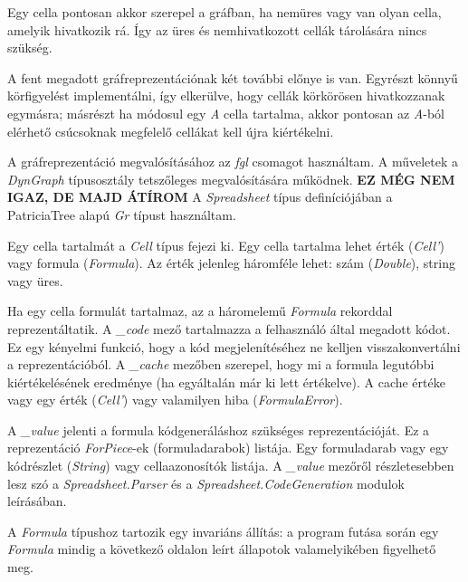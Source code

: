 Egy cella pontosan akkor szerepel a gráfban, ha nemüres vagy van olyan cella, amelyik hivatkozik rá. Így az üres és nemhivatkozott cellák tárolására nincs szükség.

A fent megadott gráfreprezentációnak két további előnye is van. Egyrészt könnyű körfigyelést implementálni, így elkerülve, hogy cellák körkörösen hivatkozzanak egymásra; másrészt ha módosul egy \textit{A} cella tartalma, akkor pontosan az \textit{A}-ból elérhető csúcsoknak megfelelő cellákat kell újra kiértékelni.

A gráfreprezentáció megvalósításához az \textit{fgl} csomagot használtam. A műveletek a \textit{DynGraph} típusosztály tetszőleges megvalósítására működnek. \textbf{EZ MÉG NEM IGAZ, DE MAJD ÁTÍROM} A \textit{Spreadsheet} típus definíciójában a PatriciaTree alapú \textit{Gr} típust használtam.

Egy cella tartalmát a \textit{Cell} típus fejezi ki. Egy cella tartalma lehet érték (\textit{Cell'}) vagy formula (\textit{Formula}). Az érték jelenleg háromféle lehet: szám (\textit{Double}), string vagy üres.

Ha egy cella formulát tartalmaz, az a háromelemű \textit{Formula} rekorddal reprezentáltatik. A \textit{\_code} mező tartalmazza a felhasználó által megadott kódot. Ez egy kényelmi funkció, hogy a kód megjelenítéséhez ne kelljen visszakonvertálni a reprezentációból. A \textit{\_cache} mezőben szerepel, hogy mi a formula legutóbbi kiértékelésének eredménye (ha egyáltalán már ki lett értékelve). A cache értéke vagy egy érték (\textit{Cell'}) vagy valamilyen hiba (\textit{FormulaError}). 

A \textit{\_value} jelenti a formula kódgeneráláshoz szükséges reprezentációját.  Ez a reprezentáció \textit{ForPiece}-ek (formuladarabok) listája. Egy formuladarab vagy egy kódrészlet (\textit{String}) vagy cellaazonosítók listája. A \textit{\_value} mezőről részletesebben lesz szó a \textit{Spreadsheet.Parser} és a \textit{Spreadsheet.CodeGeneration} modulok leírásában. 

A \textit{Formula} típushoz tartozik egy invariáns állítás: a program futása során egy \textit{Formula} mindig a következő oldalon leírt állapotok valamelyikében figyelhető meg.

